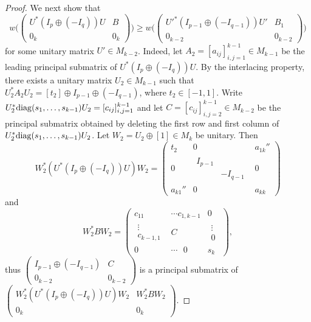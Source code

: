 \documentclass[11pt]{article}
\numberwithin{equation}{section}
\def\diag{{\rm diag}}
\begin{document}
\begin{proof}
We next show that
$$w\Big(\begin{pmatrix} U^*(I_p\oplus(-I_q))U & B\\ 0_k & 0_k\end{pmatrix}\Big) \ge  w\Big(\begin{pmatrix} {U'}^*(I_{p-1}\oplus (-I_{q-1}))U' & B_1\\ 0_{k-2} & 0_{k-2}\end{pmatrix}\Big)$$
for some unitary matrix $U'\in M_{k-2}$. Indeed, let $A_2=[a_{ij}]_{i,j=1}^{k-1}\in M_{k-1}$ be the leading principal submatrix of $U^*(I_p\oplus(-I_q))U$. By the interlacing property, there exists a unitary matrix $U_2\in M_{k-1}$ such that $U_2^*A_2U_2=[t_2]\oplus I_{p-1}\oplus (-I_{q-1})$, where $t_2\in [-1, 1]$. Write $U_2^*\diag(s_1, \dots, s_{k-1})U_2=[c_{ij}]_{i,j=1}^{k-1}$ and let $C=[c_{ij}]_{i,j=2}^{k-1}\in M_{k-2}$ be the principal submatrix obtained by deleting the first row and first column of $U_2^*\diag(s_1, \dots, s_{k-1})U_2$. Let $W_2=U_2\oplus[1]\in M_k$ be unitary. Then
$$W_2^*(U^*(I_p\oplus(-I_q))U)W_2=\left(\begin{array}{c|c|c}
t_2 & 0 & a_{1k}'' \\ \hline 0 & \begin{array}{cc} I_{p-1} &  \\ & -I_{q-1} \end{array} & 0 \\ \hline a_{k1}'' & 0 & a_{kk}\end{array}\right)$$
and
$$W_2^*BW_2=\left(\begin{array}{c|c|c}
c_{11} & \cdots c_{1, k-1} & 0 \\ \hline
\begin{array}{c} \vdots \\ c_{k-1, 1}\end{array} & C & \begin{array}{c} \vdots \\ 0\end{array} \\ \hline
0 & \cdots \ \ \ 0 & s_k
\end{array}\right),$$
thus $\begin{pmatrix} I_{p-1}\oplus (-I_{q-1}) & C \\ 0_{k-2} & 0_{k-2}\end{pmatrix}$ is a principal submatrix of $\begin{pmatrix} W_2^*(U^*(I_p\oplus(-I_q))U)W_2 & W_2^*BW_2 \\ 0_{k} & 0_{k}\end{pmatrix}$.

\end{proof}
\end{document}
